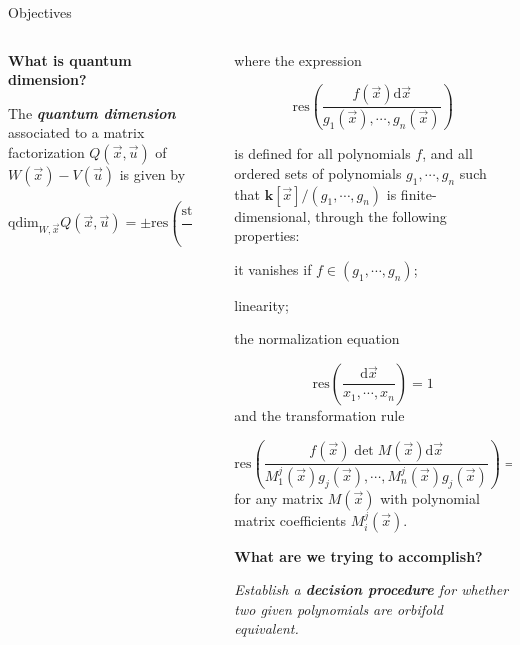 \documentclass[final]{beamer}
\newlength{\sepwid}
\newlength{\onecolwid}
\newlength{\smallercolwid}
\begin{document}
\begin{frame}[t]
\begin{alertblock}{Objectives}
\begin{columns}
\begin{column}{\smallercolwid}
\textbf{\large{}What is quantum dimension?}{\large \par}

The \textbf{\emph{quantum dimension }} associated to a matrix factorization $Q(\vec{x}, \vec{u})$ of $W(\vec{x}) - V(\vec{u})$ is given by

\[
\mathrm{qdim}_{W,\vec{x}}Q(\vec{x},\vec{u})=\pm\mathrm{res}\left(\frac{\mathrm{str}(\partial_{x_{1}}Q\cdots\partial_{x_{n}}Q\partial_{u_{1}}Q\cdots\partial_{u_{m}}Q)\mathrm{d}\vec{x}}{\partial_{x_{1}}W,\cdots,\partial_{x_{n}}W}\right)
\]

\end{column} %
\begin{column}{\sepwid}\end{column} %
\begin{column}{\onecolwid} %

where the expression

\[
\mathrm{res}\left(\frac{f(\vec{x})\mathrm{d}\vec{x}}{g_{1}(\vec{x}),\cdots,g_{n}(\vec{x})}\right)
\]

is defined for all polynomials $f$, and all ordered sets of polynomials $g_1,\cdots,g_n$ such that $\mathbf{k}[\vec{x}]/(g_1,\cdots,g_n)$ is finite-dimensional, through the
following properties:

it vanishes if $f \in (g_1,\cdots,g_n)$;

linearity;

the normalization equation

\[
\mathrm{res}\left(\frac{\mathrm{d}\vec{x}}{x_{1},\cdots,x_{n}}\right)=1
\]
and the transformation rule

\[
\mathrm{res}\left(\frac{f(\vec{x})\det M(\vec{x})\mathrm{d}\vec{x}}{M_{1}^{j}(\vec{x})g_{j}(\vec{x}),\cdots,M_{n}^{j}(\vec{x})g_{j}(\vec{x})}\right)=\mathrm{res}\left(\frac{f(\vec{x})\mathrm{d}\vec{x}}{g_{1}(\vec{x}),\cdots,g_{n}(\vec{x})}\right)
\]
for any matrix $M(\vec{x})$ with polynomial matrix coefficients $M_i^j(\vec{x})$.

\bigskip

\textbf{\large{}What are we trying to accomplish?}{\large \par}

\emph{Establish a {\bf decision procedure} for whether two given polynomials
are orbifold equivalent.}

\end{column}
\end{columns}

\end{alertblock}


\end{frame}
\end{document}
